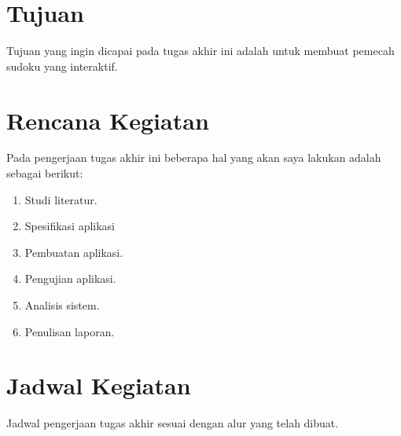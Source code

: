 \section{Tujuan}

Tujuan yang ingin dicapai pada tugas akhir ini adalah untuk membuat pemecah sudoku yang interaktif.

\section{Rencana Kegiatan}

Pada pengerjaan tugas akhir ini beberapa hal yang akan saya lakukan adalah sebagai berikut:
\begin{enumerate}
	\item Studi literatur.
	\item Spesifikasi aplikasi
	\item Pembuatan aplikasi.
	\item Pengujian aplikasi.
	\item Analisis sistem.
	\item Penulisan laporan.
	
\end{enumerate}

\section{Jadwal Kegiatan}

Jadwal pengerjaan tugas akhir sesuai dengan alur yang telah dibuat.

